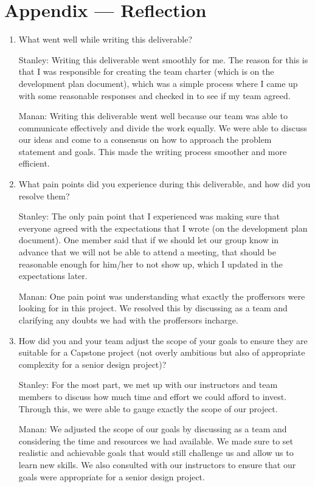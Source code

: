 \documentclass{article}
\begin{document}
\newpage{}

\section*{Appendix --- Reflection}




\begin{enumerate}
    \item What went well while writing this deliverable? 
    
Stanley: Writing this deliverable went smoothly for me. The reason for this is that I was responsible for creating the team charter (which is on the development plan document), which was a simple process where I came up with some reasonable responses and checked in to see if my team agreed. 

Manan: Writing this deliverable went well because our team was able to communicate effectively and divide the work equally. We were able to discuss our ideas and come to a consensus on how to approach the problem statement and goals. This made the writing process smoother and more efficient.

    \item What pain points did you experience during this deliverable, and how
    did you resolve them?

Stanley: The only pain point that I experienced was making sure that everyone agreed with the expectations that I wrote (on the development plan document). One member said that if we should let our group know in advance that we will not be able to attend a meeting, that should be reasonable enough for him/her to not show up, which I updated in the expectations later.  

Manan: One pain point was understanding what exactly the proffersors were looking for in this project. We resolved this by discussing as a team and clarifying any doubts we had with the proffersors incharge. 
    \item How did you and your team adjust the scope of your goals to ensure
    they are suitable for a Capstone project (not overly ambitious but also of
    appropriate complexity for a senior design project)?

Stanley: For the most part, we met up with our instructors and team members to discuss how much time and effort we could afford to invest. Through this, we were able to gauge exactly the scope of our project.  

Manan: We adjusted the scope of our goals by discussing as a team and considering the time and resources we had available. We made sure to set realistic and achievable goals that would still challenge us and allow us to learn new skills. We also consulted with our instructors to ensure that our goals were appropriate for a senior design project.
\end{enumerate}  
\end{document}
